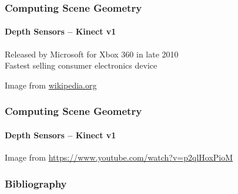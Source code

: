 \documentclass[xetex,professionalfont]{beamer}
\begin{document}

\begin{frame}
\frametitle{Computing Scene Geometry}
\framesubtitle{Depth Sensors -- Kinect v1}

Released by Microsoft for Xbox 360 in late 2010\\\medskip
Fastest selling consumer electronics device %

\bigskip
\begin{center}
    {\centering Image from \url{wikipedia.org}}
\end{center}

\end{frame}


\begin{frame}
\frametitle{Computing Scene Geometry}
\framesubtitle{Depth Sensors -- Kinect v1}

\begin{center}
    {\centering Image from \url{https://www.youtube.com/watch?v=p2qlHoxPioM}}
\end{center}

\end{frame}


\begin{frame}
\frametitle{Bibliography}

\printbibliography

\end{frame}
\end{document}
